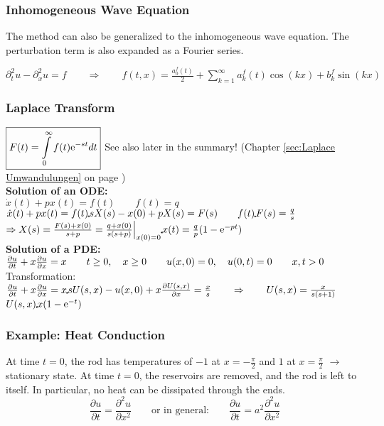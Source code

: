 \subsubsection{Inhomogeneous Wave Equation}

The method can also be generalized to the inhomogeneous wave equation. The perturbation term is also expanded as a Fourier series.

$\partial_t^2u-\partial_x^2u=f \qquad \Rightarrow \qquad f(t,x)=\frac{a_0^f(t)}{2}+\sum\limits_{k=1}^{\infty}{a^f_k(t)\cos(kx)+b^f_k\sin(kx)}$

\subsubsection{Laplace Transform}

$\boxed{F(t)=\int\limits_{0}^{\infty}{f(t)\mathrm{e}^{-st}} dt}$ \qquad See also later in the summary!
(Chapter \ref{sec:Laplace Umwandulungen} on page \pageref{sec:Laplace Umwandulungen})\\

\textbf{Solution of an ODE:}\\

$\dot{x}(t)+p x(t)=f(t) \qquad f(t)=q$\\
$\dot{x}(t)+p x(t)=f(t)\FT s X(s)-x(0)+pX(s)=F(s) \qquad f(t)\FT F(s)=\frac{q}{s}$\\

$\Rightarrow X(s)=\frac{F(s)+x(0)}{s+p}=\frac{q+x(0)}{s(s+p)}\Big|_{x(0)=0}\IFT x(t)=\frac{q}{p}(1-\e^{-pt})$\\

\textbf{Solution of a PDE:}\\

$\frac{\partial u}{\partial t}+x\frac{\partial u}{\partial x}=x\qquad t\geq 0,\quad x\geq 0\qquad u(x,0)=0,\quad u(0,t)=0\qquad x,t>0$\\

Transformation: $\partFrac{u}{t}+x\partFrac{u}{x}=x\FT sU(s,x)-u(x,0)+x\partFrac{U(s,x)}{x}=\frac{x}{s}\qquad \Rightarrow \qquad U(s,x)=\frac{x}{s(s+1)}$\\
$U(s,x)\IFT x(1-\e^{-t})$

\subsubsection{Example: Heat Conduction}

At time $t=0$, the rod has temperatures of $-1$ at $x=-\frac{\pi}2$ and
$1$ at $x=\frac{\pi}2$ $\rightarrow$ stationary state.
At time $t=0$, the reservoirs are removed, and the rod is left to itself. In particular, no heat can be dissipated through the ends.
\[
\frac{\partial u}{\partial t}=\frac{\partial^2 u}{\partial x^2} \qquad \text{or in general:} \qquad \frac{\partial u}{\partial t}= a^2 \frac{\partial^2 u}{\partial x^2}
\]

